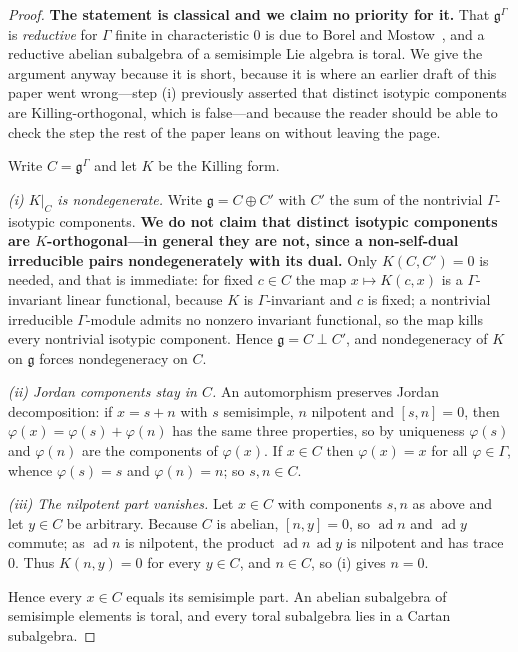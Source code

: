 \documentclass[11pt,reqno]{amsart}
\theoremstyle{plain}
\theoremstyle{definition}
\theoremstyle{remark}
\newcommand{\ad}{\operatorname{ad}}
\newcommand{\g}{\mathfrak{g}}
\begin{document}
\begin{proof}
\textbf{The statement is classical and we claim no priority for it.} That $\g^\Gamma$ is
\emph{reductive} for $\Gamma$ finite in characteristic $0$ is due to Borel and
Mostow~\cite{BorelMostow}, and a reductive abelian subalgebra of a semisimple Lie algebra
is toral. We give the argument anyway because it is short, because it is where an earlier
draft of this paper went wrong---step (i) previously asserted that distinct isotypic
components are Killing-orthogonal, which is false---and because the reader should be able
to check the step the rest of the paper leans on without leaving the page.

Write $C=\g^\Gamma$ and let $K$ be the Killing form.

\emph{(i) $K|_C$ is nondegenerate.} Write $\g=C\oplus C'$ with $C'$ the sum of the
nontrivial $\Gamma$-isotypic components. \textbf{We do not claim that distinct isotypic
components are $K$-orthogonal---in general they are not, since a non-self-dual
irreducible pairs nondegenerately with its dual.} Only $K(C,C')=0$ is needed, and that
is immediate: for fixed $c\in C$ the map $x\mapsto K(c,x)$ is a $\Gamma$-invariant linear
functional, because $K$ is $\Gamma$-invariant and $c$ is fixed; a nontrivial irreducible
$\Gamma$-module admits no nonzero invariant functional, so the map kills every nontrivial
isotypic component. Hence $\g=C\perp C'$, and nondegeneracy of $K$ on $\g$ forces
nondegeneracy on $C$.

\emph{(ii) Jordan components stay in $C$.} An automorphism preserves Jordan
decomposition: if $x=s+n$ with $s$ semisimple, $n$ nilpotent and $[s,n]=0$, then
$\varphi(x)=\varphi(s)+\varphi(n)$ has the same three properties, so by uniqueness
$\varphi(s)$ and $\varphi(n)$ are the components of $\varphi(x)$. If $x\in C$ then
$\varphi(x)=x$ for all $\varphi\in\Gamma$, whence $\varphi(s)=s$ and $\varphi(n)=n$; so
$s,n\in C$.

\emph{(iii) The nilpotent part vanishes.} Let $x\in C$ with components $s,n$ as above and
let $y\in C$ be arbitrary. Because $C$ is abelian, $[n,y]=0$, so $\ad n$ and $\ad y$
commute; as $\ad n$ is nilpotent, the product $\ad n\,\ad y$ is nilpotent and has trace
$0$. Thus $K(n,y)=0$ for every $y\in C$, and $n\in C$, so (i) gives $n=0$.

Hence every $x\in C$ equals its semisimple part. An abelian subalgebra of semisimple
elements is toral, and every toral subalgebra lies in a Cartan subalgebra.
\end{proof}
\end{document}

